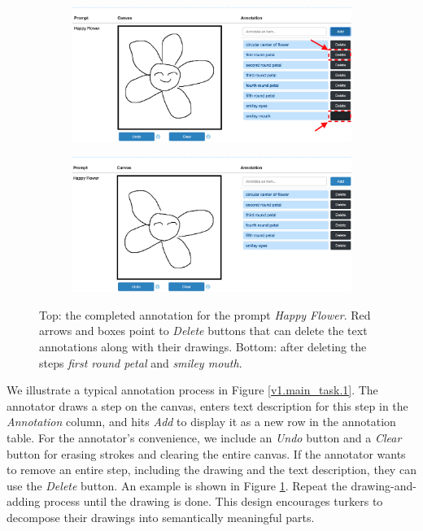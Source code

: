 \begin{figure}[!htb]
\begin{subfigure}{\textwidth}
\centering
\includegraphics[width=.8\linewidth]{data_collection/v1_before_delete.png}  
\end{subfigure}
\newline
\begin{subfigure}{\textwidth}
\centering
\includegraphics[width=.8\linewidth]{data_collection/v1_after_delete.png}  
\end{subfigure}
\caption{Top: the completed annotation for the prompt \textit{Happy Flower}. Red arrows and boxes point to \textit{Delete} buttons that can delete the text annotations along with their drawings. Bottom: after deleting the steps \textit{first round petal} and \textit{smiley mouth}.}
\label{v1.main_task.delete}
\end{figure}

We illustrate a typical annotation process in Figure \ref{v1.main_task.1}. 
The annotator draws a step on the canvas, enters text description for this step in the \textit{Annotation} column, and hits \textit{Add} to display it as a new row in the annotation table. 
For the annotator's convenience, we include an \textit{Undo} button and a \textit{Clear} button for erasing strokes and clearing the entire canvas. 
If the annotator wants to remove an entire step, including the drawing and the text description, they can use the \textit{Delete} button. An example is shown in Figure \ref{v1.main_task.delete}.
Repeat the drawing-and-adding process until the drawing is done. 
This design encourages turkers to decompose their drawings into semantically meaningful parts.

